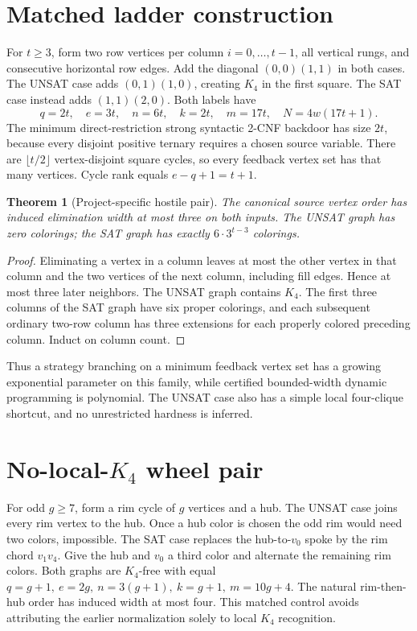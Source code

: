 \documentclass[11pt]{article}
\newtheorem{theorem}{Theorem}
\begin{document}
\section{Matched ladder construction}
For \(t\ge3\), form two row vertices per column \(i=0,\ldots,t-1\), all vertical rungs, and consecutive horizontal row edges. Add the diagonal \((0,0)(1,1)\) in both cases. The UNSAT case adds \((0,1)(1,0)\), creating \(K_4\) in the first square. The SAT case instead adds \((1,1)(2,0)\). Both labels have
\[
q=2t,\quad e=3t,\quad n=6t,\quad k=2t,\quad m=17t,\quad
N=4w(17t+1).
\]
The minimum direct-restriction strong syntactic 2-CNF backdoor has size \(2t\), because every disjoint positive ternary requires a chosen source variable. There are \(\lfloor t/2\rfloor\) vertex-disjoint square cycles, so every feedback vertex set has that many vertices. Cycle rank equals \(e-q+1=t+1\).

\begin{theorem}[Project-specific hostile pair]
The canonical source vertex order has induced elimination width at most three on both inputs. The UNSAT graph has zero colorings; the SAT graph has exactly \(6\cdot3^{t-3}\) colorings.
\end{theorem}
\begin{proof}
Eliminating a vertex in a column leaves at most the other vertex in that column and the two vertices of the next column, including fill edges. Hence at most three later neighbors. The UNSAT graph contains \(K_4\). The first three columns of the SAT graph have six proper colorings, and each subsequent ordinary two-row column has three extensions for each properly colored preceding column. Induct on column count.
\end{proof}
Thus a strategy branching on a minimum feedback vertex set has a growing exponential parameter on this family, while certified bounded-width dynamic programming is polynomial. The UNSAT case also has a simple local four-clique shortcut, and no unrestricted hardness is inferred.

\section{No-local-\(K_4\) wheel pair}
For odd \(g\ge7\), form a rim cycle of \(g\) vertices and a hub. The UNSAT case joins every rim vertex to the hub. Once a hub color is chosen the odd rim would need two colors, impossible. The SAT case replaces the hub-to-\(v_0\) spoke by the rim chord \(v_1v_4\). Give the hub and \(v_0\) a third color and alternate the remaining rim colors. Both graphs are \(K_4\)-free with equal \(q=g+1,\ e=2g,\ n=3(g+1),\ k=g+1,\ m=10g+4\). The natural rim-then-hub order has induced width at most four. This matched control avoids attributing the earlier normalization solely to local \(K_4\) recognition.
\end{document}
